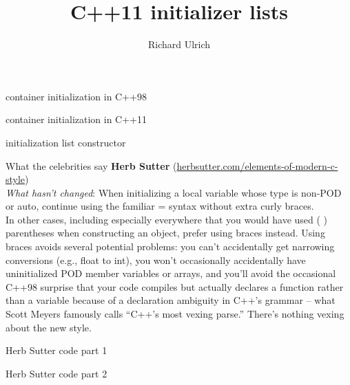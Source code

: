 \documentclass[11pt]{beamer}
\author{Richard Ulrich}
\title{C++11 initializer lists}
\institute{cubx Software AG}
\begin{document}
\begin{frame}
\titlepage
\end{frame}


\begin{frame}{container initialization in C++98}

\end{frame}

\begin{frame}{container initialization in C++11}

\end{frame}

\begin{frame}{initialization list constructor}

\end{frame}

\begin{frame}{What the celebrities say}
\textbf{Herb Sutter} (\href{http://herbsutter.com/elements-of-modern-c-style}{herbsutter.com/elements-of-modern-c-style})\\

\emph{What hasn’t changed}: When initializing a local variable whose type is non-POD or auto, continue using the familiar = syntax without extra curly braces.\\
In other cases, including especially everywhere that you would have used ( ) parentheses when constructing an object, prefer using { } braces instead. Using braces avoids several potential problems: you can’t accidentally get narrowing conversions (e.g., float to int), you won’t occasionally accidentally have uninitialized POD member variables or arrays, and you’ll avoid the occasional C++98 surprise that your code compiles but actually declares a function rather than a variable because of a declaration ambiguity in C++’s grammar – what Scott Meyers famously calls “C++’s most vexing parse.” There’s nothing vexing about the new style.
\end{frame}

\begin{frame}{Herb Sutter code part 1}

\end{frame}

\begin{frame}{Herb Sutter code part 2}

\end{frame}
\end{document}
